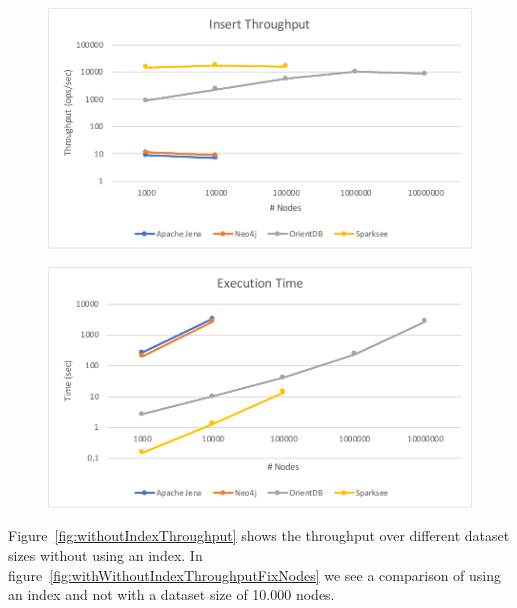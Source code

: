 \begin{figure}[h!]
  \begin{minipage}{.5\textwidth}
    \centering
    \includegraphics[width=\textwidth]{images/throughput/withIndexThroughput}
    \label{fig:withIndexThroughput}
  \end{minipage}
  \begin{minipage}{.5\textwidth}
    \centering
    \includegraphics[width=\textwidth]{images/throughput/withIndexExecutionTime}
    \label{fig:withIndexExecutionTime}
  \end{minipage}
\end{figure}

Figure~\ref{fig:withoutIndexThroughput} shows the throughput over different dataset sizes without using an index.
In figure~\ref{fig:withWithoutIndexThroughputFixNodes} we see a comparison of using an index and not with a dataset size of 10.000 nodes.

